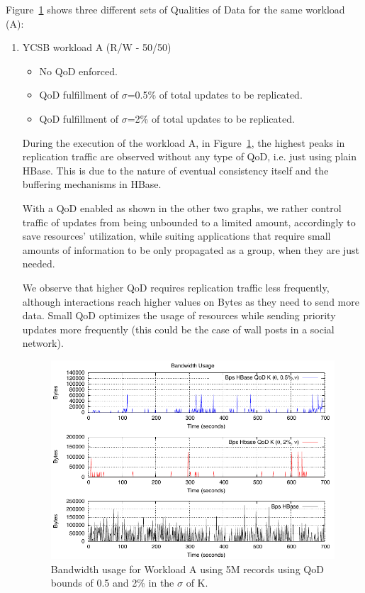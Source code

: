 Figure~\ref{fig-bandwidth-worloada} shows three different sets of Qualities of Data for the same workload (A):

\begin{enumerate}
\item{YCSB workload A (R/W - 50/50)}
	\begin{itemize}
		\item No QoD enforced.
		\item QoD fulfillment of $\sigma$=0.5\% of total updates to be replicated.
		\item QoD fulfillment of $\sigma$=2\% of total updates to be replicated.
	\end{itemize}

During the execution of the workload A, in Figure~\ref{fig-bandwidth-worloada}, the highest peaks in replication traffic are observed without any type of QoD, i.e. just using plain HBase. This is due to the nature of eventual consistency itself and the buffering mechanisms in HBase.

With a QoD enabled as shown in the other two graphs, we rather control traffic of updates from being unbounded to a limited amount, accordingly to save resources' utilization, while suiting applications that require small amounts of information to be only propagated as a group, when they are just needed.

We observe that higher QoD requires replication traffic less frequently, although interactions reach higher values on Bytes as they need to send more data. Small QoD optimizes the usage of resources while sending priority updates more frequently (this could be the case of wall posts in a social network).

\begin{figure}
\centering
\includegraphics[width=0.8\linewidth]{figs/plot-packets-size-workloada-allbounds-latest.pdf}
\caption{Bandwidth usage for Workload A using 5M records using QoD bounds of 0.5 and 2\% in the $\sigma$ of K.}
\label{fig-bandwidth-worloada}
\end{figure}


\end{enumerate}
